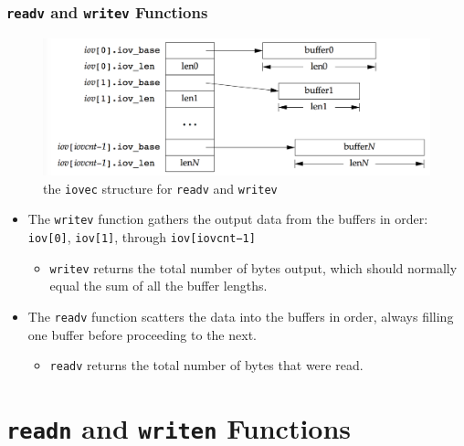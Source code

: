 \documentclass[newPxFont,sthlmFooter,nooffset]{beamer}
\begin{document}
\begin{frame}[t]
  \frametitle{\texttt{readv} and \texttt{writev} Functions}
\begin{figure}[h]
  \includegraphics[width=0.8\linewidth]{figures/fig14_22-iovec.png}
  \caption{the \texttt{iovec} structure for \texttt{readv} and \texttt{writev}}
\end{figure}

{\footnotesize 
\begin{itemize}
\item The \texttt{writev} function gathers the output data from the buffers in order: \texttt{iov[0]}, \texttt{iov[1]}, through \texttt{iov[iovcnt−1]}
  \begin{itemize}
  \item \texttt{writev} returns the total number of bytes output,
    which should normally equal the sum of all the buffer lengths.
  \end{itemize}
\item The \texttt{readv} function scatters the data into the buffers in order, always filling one buffer before proceeding to the next.
  \begin{itemize}
  \item \texttt{readv} returns the total number of bytes that were
    read.
  \end{itemize}

\end{itemize}
}
\end{frame}



\section{\texttt{readn} and \texttt{writen} Functions}
\end{document}
